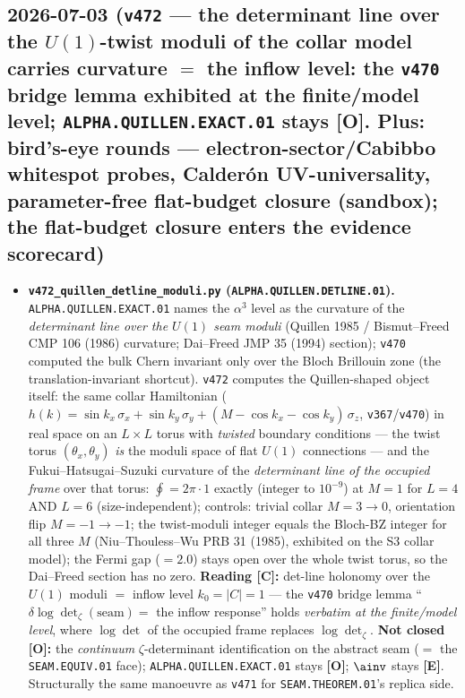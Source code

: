 \documentclass[11pt]{article}
\providecommand{\mE}{\textbf{[E]}}\providecommand{\mC}{\textbf{[C]}}
\providecommand{\mO}{\textbf{[O]}}\providecommand{\mX}{\textbf{[X]}}
\begin{document}
\subsection*{2026-07-03 (\texttt{v472} --- the determinant line over the $U(1)$-twist moduli of the collar model carries curvature $=$ the inflow level: the \texttt{v470} bridge lemma exhibited at the finite/model level; \texttt{ALPHA.QUILLEN.EXACT.01} stays \mO. Plus: bird's-eye rounds --- electron-sector/Cabibbo whitespot probes, Calder\'on UV-universality, parameter-free flat-budget closure (sandbox); the flat-budget closure enters the evidence scorecard)}
\begin{itemize}[leftmargin=1.5em]
\item \textbf{\texttt{v472\_quillen\_detline\_moduli.py} (\texttt{ALPHA.QUILLEN.DETLINE.01}).}
\texttt{ALPHA.QUILLEN.EXACT.01} names the $\alpha^3$ level as the curvature of the \emph{determinant line
over the $U(1)$ seam moduli} (Quillen 1985 / Bismut--Freed CMP 106 (1986) curvature; Dai--Freed JMP 35
(1994) section); \texttt{v470} computed the bulk Chern invariant only over the Bloch Brillouin zone (the
translation-invariant shortcut). \texttt{v472} computes the Quillen-shaped object itself: the same collar
Hamiltonian ($h(k)=\sin k_x\,\sigma_x+\sin k_y\,\sigma_y+(M-\cos k_x-\cos k_y)\,\sigma_z$,
\texttt{v367}/\texttt{v470}) in real space on an $L\times L$ torus with \emph{twisted} boundary conditions --- the twist
torus $(\theta_x,\theta_y)$ \emph{is} the moduli space of flat $U(1)$ connections --- and the
Fukui--Hatsugai--Suzuki curvature of the \emph{determinant line of the occupied frame} over that torus:
$\oint = 2\pi\cdot 1$ exactly (integer to $10^{-9}$) at $M{=}1$ for $L{=}4$ AND $L{=}6$ (size-independent);
controls: trivial collar $M{=}3\to 0$, orientation flip $M{=}{-}1\to-1$; the twist-moduli integer equals
the Bloch-BZ integer for all three $M$ (Niu--Thouless--Wu PRB 31 (1985), exhibited on the S3 collar model);
the Fermi gap ($=2.0$) stays open over the whole twist torus, so the Dai--Freed section has no zero.
\textbf{Reading \mC:} det-line holonomy over the $U(1)$ moduli $=$ inflow level $k_0=|C|=1$ --- the
\texttt{v470} bridge lemma ``$\delta\log\det_\zeta(\mathrm{seam})=$ the inflow response'' holds
\emph{verbatim at the finite/model level}, where $\log\det$ of the occupied frame replaces
$\log\det_\zeta$. \textbf{Not closed \mO:} the \emph{continuum} $\zeta$-determinant identification on the
abstract seam ($=$ the \texttt{SEAM.EQUIV.01} face); \texttt{ALPHA.QUILLEN.EXACT.01} stays \mO; $\ainv$
stays \mE. Structurally the same manoeuvre as \texttt{v471} for \texttt{SEAM.THEOREM.01}'s replica side.

\end{itemize}
\end{document}
